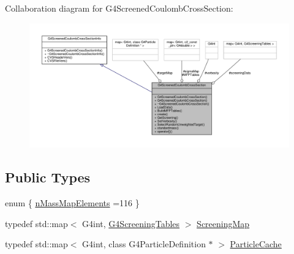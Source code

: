 Collaboration diagram for G4\+Screened\+Coulomb\+Cross\+Section\+:
\nopagebreak
\begin{figure}[H]
\begin{center}
\leavevmode
\includegraphics[width=350pt]{classG4ScreenedCoulombCrossSection__coll__graph}
\end{center}
\end{figure}
\subsection*{Public Types}
\begin{DoxyCompactItemize}
\item 
enum \{ \hyperlink{classG4ScreenedCoulombCrossSection_a8d1c04f63ce3f9412b8944b136a43a1baecfd1e5d90fb05d4c6e0a311ed092bfb}{n\+Mass\+Map\+Elements} =116
 \}
\item 
typedef std\+::map$<$ G4int, \hyperlink{structG4ScreeningTables}{G4\+Screening\+Tables} $>$ \hyperlink{classG4ScreenedCoulombCrossSection_a936cd19a7a45353257f74f1e061de448}{Screening\+Map}
\item 
typedef std\+::map$<$ G4int, class G4\+Particle\+Definition $\ast$ $>$ \hyperlink{classG4ScreenedCoulombCrossSection_a89d84b815b40ba7fe83462843964d3e4}{Particle\+Cache}
\end{DoxyCompactItemize}

